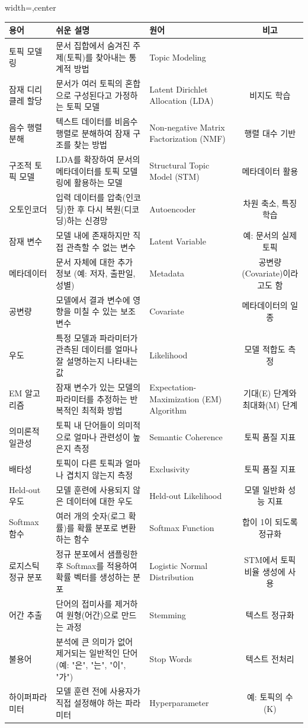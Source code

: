 \documentclass[11pt,a4paper]{article}
\theoremstyle{definition}
\begin{document}
\begin{adjustbox}{width=\textwidth,center}
\begin{tabular}{lllc}
\toprule
\textbf{용어} & \textbf{쉬운 설명} & \textbf{원어} & \textbf{비고} \\
\midrule
토픽 모델링 & 문서 집합에서 숨겨진 주제(토픽)를 찾아내는 통계적 방법 & Topic Modeling & \\
잠재 디리클레 할당 & 문서가 여러 토픽의 혼합으로 구성된다고 가정하는 토픽 모델 & Latent Dirichlet Allocation (LDA) & 비지도 학습 \\
음수 행렬 분해 & 텍스트 데이터를 비음수 행렬로 분해하여 잠재 구조를 찾는 방법 & Non-negative Matrix Factorization (NMF) & 행렬 대수 기반 \\
구조적 토픽 모델 & LDA를 확장하여 문서의 메타데이터를 토픽 모델링에 활용하는 모델 & Structural Topic Model (STM) & 메타데이터 활용 \\
오토인코더 & 입력 데이터를 압축(인코딩)한 후 다시 복원(디코딩)하는 신경망 & Autoencoder & 차원 축소, 특징 학습 \\
잠재 변수 & 모델 내에 존재하지만 직접 관측할 수 없는 변수 & Latent Variable & 예: 문서의 실제 토픽 \\
메타데이터 & 문서 자체에 대한 추가 정보 (예: 저자, 출판일, 성별) & Metadata & 공변량(Covariate)이라고도 함 \\
공변량 & 모델에서 결과 변수에 영향을 미칠 수 있는 보조 변수 & Covariate & 메타데이터의 일종 \\
우도 & 특정 모델과 파라미터가 관측된 데이터를 얼마나 잘 설명하는지 나타내는 값 & Likelihood & 모델 적합도 측정 \\
EM 알고리즘 & 잠재 변수가 있는 모델의 파라미터를 추정하는 반복적인 최적화 방법 & Expectation-Maximization (EM) Algorithm & 기대(E) 단계와 최대화(M) 단계 \\
의미론적 일관성 & 토픽 내 단어들이 의미적으로 얼마나 관련성이 높은지 측정 & Semantic Coherence & 토픽 품질 지표 \\
배타성 & 토픽이 다른 토픽과 얼마나 겹치지 않는지 측정 & Exclusivity & 토픽 품질 지표 \\
Held-out 우도 & 모델 훈련에 사용되지 않은 데이터에 대한 우도 & Held-out Likelihood & 모델 일반화 성능 지표 \\
Softmax 함수 & 여러 개의 숫자(로그 확률)를 확률 분포로 변환하는 함수 & Softmax Function & 합이 1이 되도록 정규화 \\
로지스틱 정규 분포 & 정규 분포에서 샘플링한 후 Softmax를 적용하여 확률 벡터를 생성하는 분포 & Logistic Normal Distribution & STM에서 토픽 비율 생성에 사용 \\
어간 추출 & 단어의 접미사를 제거하여 원형(어간)으로 만드는 과정 & Stemming & 텍스트 정규화 \\
불용어 & 분석에 큰 의미가 없어 제거되는 일반적인 단어 (예: "은", "는", "이", "가") & Stop Words & 텍스트 전처리 \\
하이퍼파라미터 & 모델 훈련 전에 사용자가 직접 설정해야 하는 파라미터 & Hyperparameter & 예: 토픽의 수(K) \\
\bottomrule
\end{tabular}
\end{adjustbox}
\end{document}
